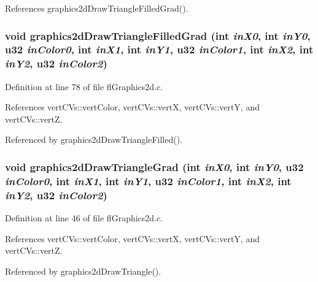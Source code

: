 References graphics2d\-Draw\-Triangle\-Filled\-Grad().
\subsubsection{\setlength{\rightskip}{0pt plus 5cm}void graphics2d\-Draw\-Triangle\-Filled\-Grad (int {\em in\-X0}, int {\em in\-Y0}, u32 {\em in\-Color0}, int {\em in\-X1}, int {\em in\-Y1}, u32 {\em in\-Color1}, int {\em in\-X2}, int {\em in\-Y2}, u32 {\em in\-Color2})}\label{flGraphics2d_8c_503a127802567b2d5d3ead8d2281ed56}




Definition at line 78 of file fl\-Graphics2d.c.

References vert\-CVs::vert\-Color, vert\-CVs::vert\-X, vert\-CVs::vert\-Y, and vert\-CVs::vert\-Z.

Referenced by graphics2d\-Draw\-Triangle\-Filled().
\subsubsection{\setlength{\rightskip}{0pt plus 5cm}void graphics2d\-Draw\-Triangle\-Grad (int {\em in\-X0}, int {\em in\-Y0}, u32 {\em in\-Color0}, int {\em in\-X1}, int {\em in\-Y1}, u32 {\em in\-Color1}, int {\em in\-X2}, int {\em in\-Y2}, u32 {\em in\-Color2})}\label{flGraphics2d_8c_b0897647bc7e2d680962b311b2882eef}




Definition at line 46 of file fl\-Graphics2d.c.

References vert\-CVs::vert\-Color, vert\-CVs::vert\-X, vert\-CVs::vert\-Y, and vert\-CVs::vert\-Z.

Referenced by graphics2d\-Draw\-Triangle().
